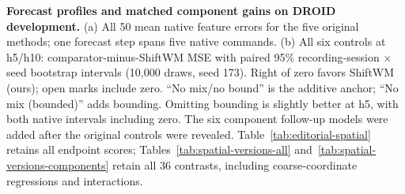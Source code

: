 \textbf{Forecast profiles and matched component gains on DROID development.}
(a) All 50 mean native feature errors for the five original methods; one forecast
step spans five native commands. (b) All six controls at h5/h10: comparator-minus-ShiftWM
MSE with paired 95\% recording-session $\times$ seed bootstrap intervals
(10,000 draws, seed 173). Right of zero favors ShiftWM (ours); open marks include
zero. ``No mix/no bound'' is the additive anchor; ``No mix (bounded)'' adds bounding.
Omitting bounding is slightly better at h5, with both native intervals including
zero. The six component follow-up models were added after the original controls
were revealed. Table~\ref{tab:editorial-spatial} retains all endpoint scores;
Tables~\ref{tab:spatial-versions-all} and~\ref{tab:spatial-versions-components}
retain all 36 contrasts, including coarse-coordinate regressions and interactions.
